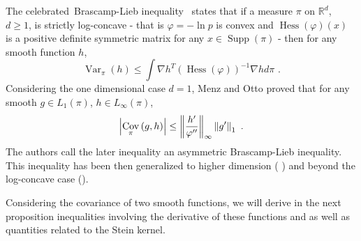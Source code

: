 \documentclass[11pt]{article}
\DeclareMathOperator{\var}{Var}
\DeclareMathOperator{\cov}{Cov}
\DeclareMathOperator{\Supp}{Supp}
\DeclareMathOperator{\Hess}{Hess}
\begin{document}
The celebrated\ Brascamp-Lieb inequality \cite{MR0450480}\ states that if a
measure $\pi $ on $\mathbb{R}^{d}$, $d\geq 1$, is strictly log-concave -
that is $\varphi =-\ln p$ is convex and $%
\Hess%
\left( \varphi \right) \left( x\right) $ is a positive definite symmetric
matrix for any $x\in 
\Supp%
\left( \pi \right) $ - then for any smooth function $h$,%
\begin{equation*}
\var%
_{\pi }\left( h\right) \leq \int \nabla h^{T}(%
\Hess%
\left( \varphi \right) )^{-1}\nabla hd\pi \text{ .}
\end{equation*}%
Considering the one dimensional case $d=1$, Menz and Otto \cite%
{Menz-Otto:2013} proved that for any smooth $g\in L_{1}\left( \pi \right) $, 
$h\in L_{\infty }\left( \pi \right) $, 
\begin{equation}
\left\vert 
\cov%
_{\pi }\left( g,h\right) \right\vert \leq \left\Vert \frac{h^{\prime }}{%
\varphi ^{\prime \prime }}\right\Vert _{\infty }\left\Vert g^{\prime
}\right\Vert _{1}\text{ .}  \label{asymm_BL}
\end{equation}%
The authors call the later inequality an asymmetric Brascamp-Lieb
inequality. This inequality has been then generalized to higher dimension (%
\cite{CarlenCordero-ErausquinLieb}) and beyond the log-concave case (\cite%
{arnaudon2016intertwinings}).

Considering the covariance of two smooth functions, we will derive in the
next proposition inequalities involving the derivative of these functions
and as well as quantities related to the Stein kernel.
\end{document}
